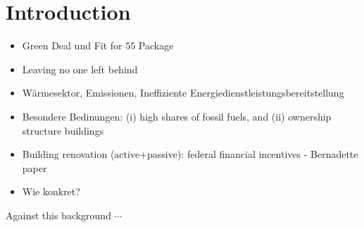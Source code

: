 \section{Introduction}


\begin{itemize}
	\item[\textcolor{col}{\textbullet}] \textcolor{col}{Green Deal und Fit for 55 Package}
	\item[\textcolor{col}{\textbullet}] \textcolor{col}{Leaving no one left behind}
	\item[\textcolor{col}{\textbullet}] \textcolor{col}{Wärmesektor, Emissionen, Ineffiziente Energiedienstleistungsbereitstellung}
	\item[\textcolor{col}{\textbullet}] \textcolor{col}{Besondere Bedinungen: (i) high shares of fossil fuels, and (ii) ownership structure buildings}
	\item[\textcolor{col}{\textbullet}] \textcolor{col}{Building renovation (active+passive): federal financial incentives - Bernadette paper}
	\item[\textcolor{col}{\textbullet}] \textcolor{col}{Wie konkret?}
\end{itemize}

\textcolor{col}{Against this background $\cdots$}



